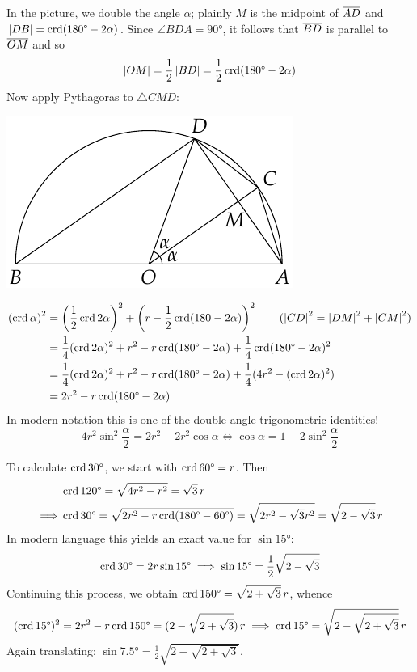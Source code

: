 \begin{minipage}[t]{0.6\linewidth}\vspace{0pt}
	In the picture, we double the angle $\alpha$; plainly $M$ is the midpoint of $\cl{AD}$ and $\nm{DB}=\crd(\ang{180}-2\alpha)$. Since $\angle BDA=\ang{90}$, it follows that $\cl{BD}$ is parallel to $\cl{OM}$ and so
	\[\nm{OM}=\frac 12\nm{BD}=\frac 12\crd(\ang{180}-2\alpha)\]
	Now apply Pythagoras to $\triangle CMD$:
\end{minipage}\begin{minipage}[t]{0.4\linewidth}\vspace{0pt}
	\flushright\includegraphics[scale=0.95]{trig-double}
\end{minipage}
\begin{align*}
\left(\crd\alpha\right)^2&=\left(\frac 12\crd 2\alpha\right)^2+\left(r-\frac 12\crd(180-2\alpha)\right)^2 \tag{$\nm{CD}^2=\nm{DM}^2+\nm{CM}^2$}\\
&=\frac 14(\crd 2\alpha)^2+r^2-r\crd(\ang{180}-2\alpha)+\frac 14\crd(\ang{180}-2\alpha)^2\\
&=\frac 14(\crd 2\alpha)^2+r^2-r\crd(\ang{180}-2\alpha)+\frac 14(4r^2-(\crd 2\alpha)^2)\\
&=2r^2-r\crd(\ang{180}-2\alpha)
\end{align*}
In modern notation this is one of the double-angle trigonometric identities!
\[4r^2\sin^2\frac\alpha 2=2r^2-2r^2\cos\alpha\iff \cos\alpha=1-2\sin^2\frac\alpha 2\]
\goodbreak


 To calculate $\crd \ang{30}$, we start with $\crd\ang{60}=r$. Then
\begin{align*}
&\crd\ang{120}=\sqrt{4r^2-r^2}=\sqrt 3\,r\\
\implies &\crd\ang{30}=\sqrt{2r^2-r\crd(\ang{180}-\ang{60})}=\sqrt{2r^2-\sqrt 3r^2}=\sqrt{2-\sqrt 3}\,r
\end{align*}
In modern language this yields an exact value for $\sin\ang{15}$:
\[\crd\ang{30}=2r\sin\ang{15}\implies\sin\ang{15} =\frac 12\sqrt{2-\sqrt 3}\]
Continuing this process, we obtain $\crd \ang{150}=\sqrt{2+\sqrt 3}\,r$, whence
\[(\crd\ang{15})^2=2r^2-r\crd\ang{150}=(2-\sqrt{2+\sqrt 3})\,r\implies \crd\ang{15}=\sqrt{2-\sqrt{2+\sqrt 3}}\,r\]
Again translating: $\sin\ang{7.5}=\frac 12\sqrt{2-\sqrt{2+\sqrt 3}}$.\smallbreak

